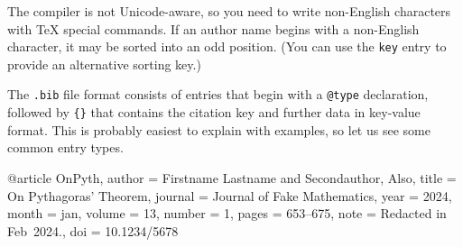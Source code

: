 \begin{gotcha}
The  compiler is not Unicode-aware,
so you need to write non-English characters with \TeX{} special commands.
If an author name begins with a non-English character,
it may be sorted into an odd position.
(You can use the \verb|key| entry to provide an alternative sorting key.)
\end{gotcha}

The \verb|.bib| file format consists of entries that begin with a \verb|@type| declaration,
followed by \verb|{}| that contains the citation key
and further data in key-value format.
This is probably easiest to explain with examples,
so let us see some common entry types.

\begin{ExampleCode}
@article {OnPyth,
    author = {Firstname Lastname and Secondauthor, Also},
    title = {On {Pythagoras'} Theorem},
    journal = {Journal of Fake Mathematics},
    year = {2024},
    month = {jan},
    volume = {13},
    number = {1},
    pages = {653--675},
    note = {Redacted in Feb~2024.},
    doi = {10.1234/5678}
}
\end{ExampleCode}

